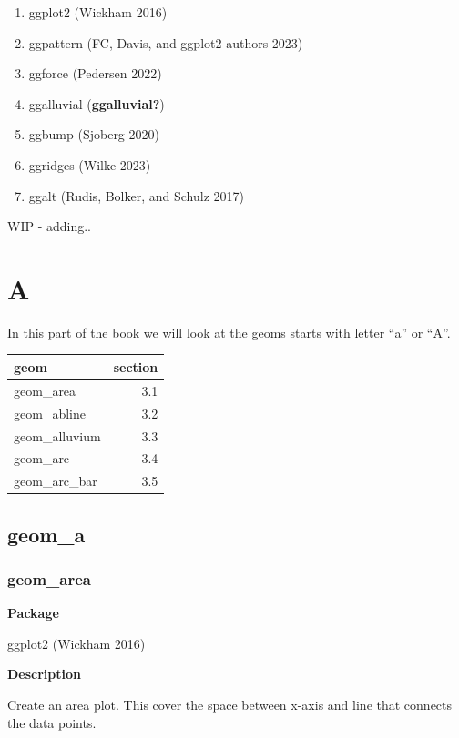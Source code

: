 \documentclass[
  letterpaper,
  DIV=11,
  numbers=noendperiod]{scrreprt}
\begin{document}

\begin{enumerate}
\def\labelenumi{\arabic{enumi}.}
\item
  ggplot2 (Wickham 2016)
\item
  ggpattern (FC, Davis, and ggplot2 authors 2023)
\item
  ggforce (Pedersen 2022)
\item
  ggalluvial (\textbf{ggalluvial?})
\item
  ggbump (Sjoberg 2020)
\item
  ggridges (Wilke 2023)
\item
  ggalt (Rudis, Bolker, and Schulz 2017)
\end{enumerate}

WIP - adding..

\part{A}

In this part of the book we will look at the geoms starts with letter
``a'' or ``A''.

\begin{longtable}[]{@{}lr@{}}
\toprule\noalign{}
geom & section \\
\midrule\noalign{}
\endhead
\bottomrule\noalign{}
\endlastfoot
geom\_area & 3.1 \\
geom\_abline & 3.2 \\
geom\_alluvium & 3.3 \\
geom\_arc & 3.4 \\
geom\_arc\_bar & 3.5 \\
\end{longtable}

\chapter{geom\_a}\label{sec-a}

\section{geom\_area}\label{area}

\textbf{Package}

ggplot2 (Wickham 2016)

\textbf{Description}

Create an area plot. This cover the space between x-axis and line that
connects the data points.
\end{document}

